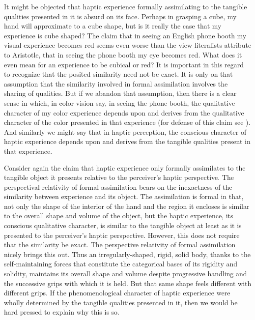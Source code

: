 It might be objected that haptic experience formally assimilating to the tangible qualities presented in it is absurd on its face. Perhaps in grasping a cube, my hand will approximate to a cube shape, but is it really the case that my experience is cube shaped? The claim that in seeing an English phone booth my visual experience becomes red seems even worse than the view literalists attribute to Aristotle, that in seeing the phone booth my eye becomes red. What does it even mean for an experience to be cubical or red? It is important in this regard to recognize that the posited similarity need not be exact. It is only on that assumption that the similarity involved in formal assimilation involves the sharing of qualities. But if we abandon that assumption, then there is a clear sense in which, in color vision say, in seeing the phone booth, the qualitative character of my color experience depends upon and derives from the qualitative character of the color presented in that experience (for defense of this claim see \citealt{Kalderon:2008fk,Kalderon:2007mr,Kalderon:2011fk}). And similarly we might say that in haptic perception, the conscious character of haptic experience depends upon and derives from the tangible qualities present in that experience. 

Consider again the claim that haptic experience only formally assimilates to the tangible object it presents relative to the perceiver's haptic perspective. The perspectival relativity of formal assimilation bears on the inexactness of the similarity between experience and its object. The assimilation is formal in that, not only the shape of the interior of the hand and the region it encloses is similar to the overall shape and volume of the object, but the haptic experience, its conscious qualitative character, is similar to the tangible object at least as it is presented to the perceiver's haptic perspective. However, this does not require that the similarity be exact. The perspective relativity of formal assimilation nicely brings this out. Thus an irregularly-shaped, rigid, solid body, thanks to the self-maintaining forces that constitute the categorical bases of its rigidity and solidity, maintains its overall shape and volume despite progressive handling and the successive grips with which it is held. But that same shape feels different with different grips. If the phenomenological character of haptic experience were wholly determined by the tangible qualities presented in it, then we would be hard pressed to explain why this is so. 

